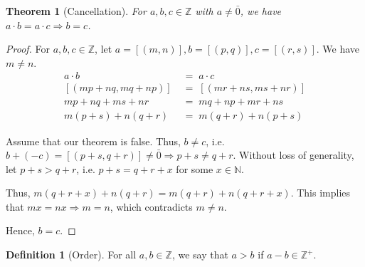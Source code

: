 \documentclass[10pt]{article}
\newtheorem{theorem}{Theorem}[section]
\theoremstyle{definition}
\newtheorem*{definition}{Definition}
\theoremstyle{remark}
\newcommand{\N}{\mathbb{N}}
\newcommand{\Z}{\mathbb{Z}}
\begin{document}
        \begin{theorem}[Cancellation]
                For $a, b, c \in \Z$ with $a\neq \bar{0}$, we have $a\cdot b = a\cdot c
                \Rightarrow b = c$.
        \end{theorem}
        \begin{proof}
                For $a,b,c \in \Z$, let $a = [(m, n)], b = [(p, q)], c = [(r, s)]$.
                We have $m \neq n$.
                \begin{align*}
                a\cdot b \;&=\; a\cdot c\\
                [(mp + nq, mq + np)] \;&=\; [(mr + ns, ms + nr)] \\
                mp + nq + ms + nr \;&=\; mq + np + mr + ns \\
                m(p + s) + n (q + r) \;&=\; m(q + r) + n(p + s)
                \end{align*}
                
                Assume that our theorem is false.
                Thus, $b\neq c$, i.e. $b + (-c) = [(p + s, q + r)] \neq \bar{0} \Rightarrow p + s \neq q + r$.
                Without loss of generality, let $p + s > q + r$, i.e. $p + s = q + r + x$ for some $x \in \N$.

                Thus, $m(q + r + x) + n(q + r) = m(q + r) + n(q + r + x)$. This implies that
                $mx = nx \Rightarrow m = n$, which contradicts $m \neq n$.

                Hence, $b = c$.
        \end{proof}
        
        \begin{definition}[Order]
                For all $a, b \in \Z$, we say that $a > b$ if $a - b \in \Z^+$.
        \end{definition}
        
\end{document}
